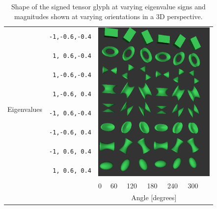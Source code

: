 \documentclass{InsightArticle}
\begin{document}
\renewcommand{\arraystretch}{2.09}
\begin{table}[ht]
  \begin{tabular}{cc p{0.01cm}p{0.4cm}p{0.5cm}p{0.5cm}p{0.5cm}p{0.5cm}p{0.5cm}}
    \hline
    \multirow{9}{*}{Eigenvalues}
    &\texttt{-1,-0.6,-0.4}&\multicolumn{7}{l}{\multirow{8}{*}{\includegraphics[width=6cm]{SignedEigenvalueTensorGlyphMatrix}}} \\
    &\texttt{ 1, 0.6,-0.4}& & & & & & & \\
    &\texttt{ 1,-0.6,-0.4}& & & & & & & \\
    &\texttt{ 1,-0.6, 0.4}& & & & & & & \\
    &\texttt{-1, 0.6,-0.4}& & & & & & & \\
    &\texttt{-1,-0.6, 0.4}& & & & & & & \\
    &\texttt{-1, 0.6, 0.4}& & & & & & & \\
    &\texttt{ 1, 0.6, 0.4}& & & & & & & \\
    \hline
    \multicolumn{2}{c}{}& & 0 & 60 & 120 & 180 & 240 & 300 \\ [-1.1em]
    \multicolumn{2}{c}{}& \multicolumn{7}{c}{Angle [degrees]} \\
    \cline{3-9}
  \end{tabular}
  \caption{Shape of the signed tensor glyph at varying eigenvalue signs and
  magnitudes shown at varying orientations in a 3D perspective.}
  \label{tab:signed-flavors}
\end{table}
\end{document}
